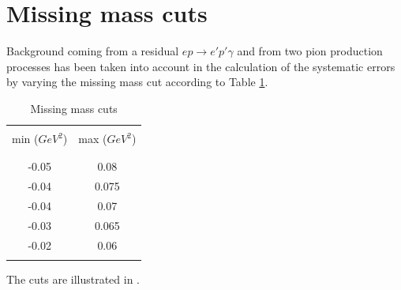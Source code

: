 \cia \vspace{-2cm}
\section{Missing mass cuts}

Background coming from a residual $ep\rightarrow e'p'\gamma $
and from two pion production processes has been taken into account
in the calculation of the systematic errors by varying the missing mass cut according
to Table \ref{tab:missing_mass_cuts}.


\begin{table}[h]
 \begin{center}
  \begin{tabular}{c | c}
    & \\
    min ($GeV^2$)  &  max ($GeV^2$)  \\ 
    & \\
    \hline
    & \\
    -0.05  & 0.08  \\
    -0.04  & 0.075 \\ 
    -0.04  & 0.07  \\
    -0.03  & 0.065 \\
    -0.02  & 0.06  \\
    & \\
    \hline
  \end{tabular}
 \end{center} 
 \caption{ Missing mass cuts}
 \label{tab:missing_mass_cuts}
\end{table}

The cuts are illustrated in .

